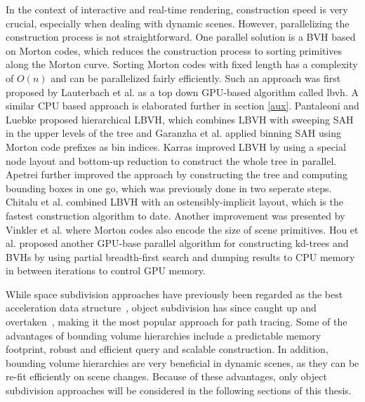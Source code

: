 In the context of interactive and real-time rendering, construction speed is very crucial, especially when dealing with dynamic scenes. However, parallelizing the construction process is not straightforward. One parallel solution is a BVH based on Morton codes, which reduces the construction process to sorting primitives along the Morton curve\cite{morton66curve}. Sorting Morton codes with fixed length has a complexity of $O(n)$ and can be parallelized fairly efficiently. Such an approach was first proposed by Lauterbach et al.\cite{lauterbach09lbvh} as a top down GPU-based algorithm called \acrfull{lbvh}. A similar CPU based approach is elaborated further in section \ref{aux}. Pantaleoni and Luebke\cite{pantaleoni10hlbvh} proposed hierarchical LBVH, which combines LBVH with sweeping SAH in the upper levels of the tree and Garanzha et al.\cite{garanzha11hlbvh} applied binning SAH using Morton code prefixes as bin indices. Karras\cite{karras12lbvh} improved LBVH by using a special node layout and bottom-up reduction to construct the whole tree in parallel. Apetrei\cite{apetrei14lbvh} further improved the approach by constructing the tree and computing bounding boxes in one go, which was previously done in two seperate steps. Chitalu et al.\cite{chitalu20lbvh} combined LBVH with an ostensibly-implicit layout, which is the fastest construction algorithm to date\cite{meister21survey}.
Another improvement was presented by Vinkler et al.\cite{vinkler17morton} where Morton codes also encode the size of scene primitives. Hou et al.\cite{hou11bvh} proposed another GPU-base parallel algorithm for constructing kd-trees and BVHs by using partial breadth-first search and dumping results to CPU memory in between iterations to control GPU memory. 

While space subdivision approaches have previously been regarded as the best acceleration data structure~\cite{havrand2000comparison}, object subdivision has since caught up and overtaken~\cite{vinkler2015comparison}, making it the most popular approach for path tracing. Some of the advantages of bounding volume hierarchies include a predictable memory footprint, robust and efficient query and scalable construction. In addition, bounding volume hierarchies are very beneficial in dynamic scenes\cite{wald_ray_2007}, as they can be re-fit efficiently on scene changes. Because of these advantages, only object subdivision approaches will be considered in the following sections of this thesis.
\cleardoublepage